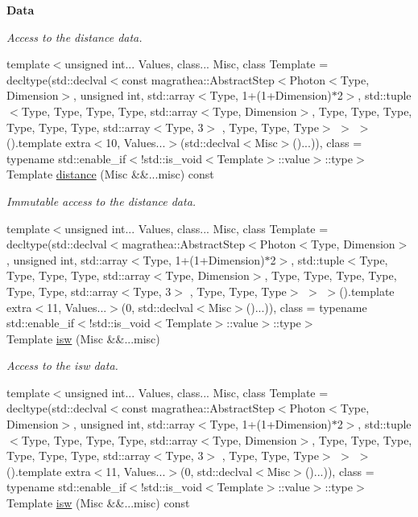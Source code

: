 \begin{Indent}{\bf Data}
\begin{DoxyCompactItemize}
\begin{DoxyCompactList}\small\item\em Access to the distance data. \end{DoxyCompactList}\item 
{\footnotesize template$<$unsigned int... Values, class... Misc, class Template  = decltype(std\-::declval$<$const magrathea\-::\-Abstract\-Step$<$\-Photon$<$\-Type, Dimension$>$, unsigned int, std\-::array$<$\-Type, 1+(1+\-Dimension)$\ast$2$>$, std\-::tuple$<$\-Type, Type, Type, Type, std\-::array$<$\-Type, Dimension$>$, Type, Type, Type, Type, Type, Type, std\-::array$<$\-Type, 3$>$ , Type, Type, Type$>$ $>$ $>$().\-template extra$<$10, Values...$>$(std\-::declval$<$\-Misc$>$()...)), class  = typename std\-::enable\-\_\-if$<$!std\-::is\-\_\-void$<$\-Template$>$\-::value$>$\-::type$>$ }\\Template \hyperlink{exceptionPhoton_a1e4bdca01bb522ab303eb2c472301397}{distance} (Misc \&\&...misc) const 
\begin{DoxyCompactList}\small\item\em Immutable access to the distance data. \end{DoxyCompactList}\item 
{\footnotesize template$<$unsigned int... Values, class... Misc, class Template  = decltype(std\-::declval$<$magrathea\-::\-Abstract\-Step$<$\-Photon$<$\-Type, Dimension$>$, unsigned int, std\-::array$<$\-Type, 1+(1+\-Dimension)$\ast$2$>$, std\-::tuple$<$\-Type, Type, Type, Type, std\-::array$<$\-Type, Dimension$>$, Type, Type, Type, Type, Type, Type, std\-::array$<$\-Type, 3$>$ , Type, Type, Type$>$ $>$ $>$().\-template extra$<$11, Values...$>$(0, std\-::declval$<$\-Misc$>$()...)), class  = typename std\-::enable\-\_\-if$<$!std\-::is\-\_\-void$<$\-Template$>$\-::value$>$\-::type$>$ }\\Template \hyperlink{exceptionPhoton_a7f773159e0a75c510a0786ab0d51cf3a}{isw} (Misc \&\&...misc)
\begin{DoxyCompactList}\small\item\em Access to the isw data. \end{DoxyCompactList}\item 
{\footnotesize template$<$unsigned int... Values, class... Misc, class Template  = decltype(std\-::declval$<$const magrathea\-::\-Abstract\-Step$<$\-Photon$<$\-Type, Dimension$>$, unsigned int, std\-::array$<$\-Type, 1+(1+\-Dimension)$\ast$2$>$, std\-::tuple$<$\-Type, Type, Type, Type, std\-::array$<$\-Type, Dimension$>$, Type, Type, Type, Type, Type, Type, std\-::array$<$\-Type, 3$>$ , Type, Type, Type$>$ $>$ $>$().\-template extra$<$11, Values...$>$(0, std\-::declval$<$\-Misc$>$()...)), class  = typename std\-::enable\-\_\-if$<$!std\-::is\-\_\-void$<$\-Template$>$\-::value$>$\-::type$>$ }\\Template \hyperlink{exceptionPhoton_abac466cae87cd13d4621bcd0dda8f5ac}{isw} (Misc \&\&...misc) const 

\end{DoxyCompactItemize}
\end{Indent}
